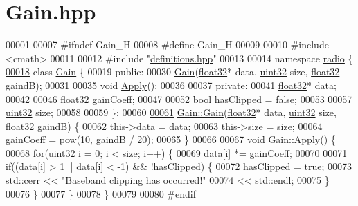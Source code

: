 \hypertarget{Gain_8hpp_source}{\section{Gain.\+hpp}
\label{Gain_8hpp_source}
}

\begin{DoxyCode}
00001 
00007 \textcolor{preprocessor}{#ifndef Gain\_H}
00008 \textcolor{preprocessor}{#define Gain\_H}
00009 
00010 \textcolor{preprocessor}{#include <cmath>}
00011 
00012 \textcolor{preprocessor}{#include "\hyperlink{definitions_8hpp}{definitions.hpp}"}
00013 
00014 \textcolor{keyword}{namespace }\hyperlink{namespaceradio}{radio} \{
\hypertarget{Gain_8hpp_source_l00018}{}\hyperlink{classradio_1_1Gain}{00018}     \textcolor{keyword}{class }\hyperlink{classradio_1_1Gain}{Gain} \{
00019         \textcolor{keyword}{public}:
00030             \hyperlink{classradio_1_1Gain_a11f137515c0ecc04333c7d92eea2cf79}{Gain}(\hyperlink{definitions_8hpp_aacdc525d6f7bddb3ae95d5c311bd06a1}{float32}* data, \hyperlink{definitions_8hpp_a1134b580f8da4de94ca6b1de4d37975e}{uint32} size, \hyperlink{definitions_8hpp_aacdc525d6f7bddb3ae95d5c311bd06a1}{float32} gaindB);
00031 
00035             \textcolor{keywordtype}{void} \hyperlink{classradio_1_1Gain_a8c6df2c5989da0e560c8f276e6138a2d}{Apply}();
00036 
00037         \textcolor{keyword}{private}:
00041             \hyperlink{definitions_8hpp_aacdc525d6f7bddb3ae95d5c311bd06a1}{float32}* data;
00042 
00046             \hyperlink{definitions_8hpp_aacdc525d6f7bddb3ae95d5c311bd06a1}{float32} gainCoeff;
00047 
00052             \textcolor{keywordtype}{bool} hasClipped = \textcolor{keyword}{false};
00053 
00057             \hyperlink{definitions_8hpp_a1134b580f8da4de94ca6b1de4d37975e}{uint32} size;
00058 
00059     \};
00060 
\hypertarget{Gain_8hpp_source_l00061}{}\hyperlink{classradio_1_1Gain_a11f137515c0ecc04333c7d92eea2cf79}{00061}     \hyperlink{classradio_1_1Gain_a11f137515c0ecc04333c7d92eea2cf79}{Gain::Gain}(\hyperlink{definitions_8hpp_aacdc525d6f7bddb3ae95d5c311bd06a1}{float32}* data, \hyperlink{definitions_8hpp_a1134b580f8da4de94ca6b1de4d37975e}{uint32} size, \hyperlink{definitions_8hpp_aacdc525d6f7bddb3ae95d5c311bd06a1}{float32} gaindB) \{
00062         this->data = data;
00063         this->size = size;
00064         gainCoeff = pow(10, gaindB / 20);
00065     \}
00066 
\hypertarget{Gain_8hpp_source_l00067}{}\hyperlink{classradio_1_1Gain_a8c6df2c5989da0e560c8f276e6138a2d}{00067}     \textcolor{keywordtype}{void} \hyperlink{classradio_1_1Gain_a8c6df2c5989da0e560c8f276e6138a2d}{Gain::Apply}() \{
00068         \textcolor{keywordflow}{for}(\hyperlink{definitions_8hpp_a1134b580f8da4de94ca6b1de4d37975e}{uint32} i = 0; i < size; i++) \{
00069             data[i] *= gainCoeff;
00070 
00071             \textcolor{keywordflow}{if}((data[i] > 1 || data[i] < -1) && !hasClipped) \{
00072                 hasClipped = \textcolor{keyword}{true};
00073                 std::cerr << \textcolor{stringliteral}{"Baseband clipping has occurred!"}
00074                     << std::endl;
00075             \}
00076         \}
00077     \}
00078 \}
00079 
00080 \textcolor{preprocessor}{#endif}
\end{DoxyCode}
